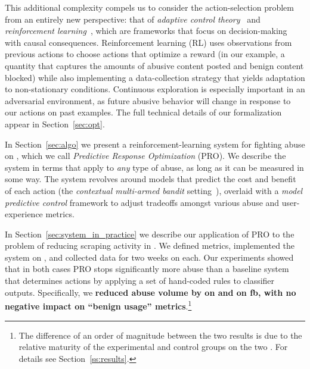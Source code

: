 This additional complexity compels us to consider the action-selection problem from an entirely new perspective: that of {\em adaptive control theory}~\cite{aastrom2008adaptive} and {\em reinforcement learning}~\cite{sutton2018reinforcement}, which are frameworks that focus on decision-making with causal consequences. Reinforcement learning (RL) uses observations from previous actions to choose actions that optimize a reward (in our example, a quantity that captures the amounts of abusive content posted and benign content blocked) while also implementing a data-collection strategy that yields adaptation to non-stationary conditions. Continuous exploration is especially important in an adversarial environment, as future abusive behavior will change in response to our actions on past examples. The full technical details of our formalization appear in Section~\ref{sec:opt}.

In Section~\ref{sec:algo} we present a reinforcement-learning system for fighting abuse on \osns, which we call {\em Predictive Response Optimization} (PRO). We describe the system in terms that apply to {\em any} type of abuse, as long as it can be measured in some way. The system revolves around models that predict the cost and benefit of each action (the {\em contextual multi-armed bandit} setting~\cite{Li_2010}), overlaid with a {\em model predictive control} framework to adjust tradeoffs amongst various abuse and user-experience metrics.

In Section~\ref{sec:system_in_practice} we describe our application of PRO to the problem of reducing scraping activity in \osns. We defined metrics, implemented the system on \fbig, and collected data for two weeks on each. Our experiments showed that in both cases PRO stops significantly more abuse than a baseline system that determines actions by applying a set of hand-coded rules to classifier outputs. Specifically, we {\bf reduced abuse volume by \igreduction on \ig and \fbreduction on fb, with no negative impact on ``benign usage'' metrics}.\footnote{The difference of an order of magnitude between the two results is due to the relative maturity of the experimental and control groups on the two \osns. For details see Section~\ref{ss:results}.}

